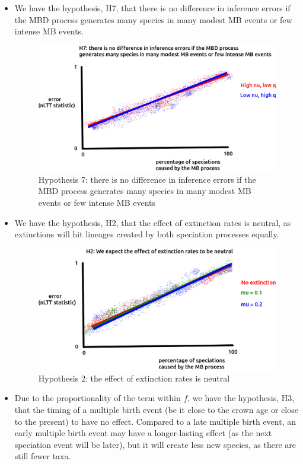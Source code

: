 \documentclass{article}
\begin{document}
\begin{itemize}
\item We have the hypothesis, H7, 
that there is no difference in inference errors if the MBD process
generates many species in many modest MB events or few intense MB events.

\begin{figure}[!htbp]
  \includegraphics[width=\textwidth]{fig_h_7.png}
  \caption{
    Hypothesis 7: there is no difference in inference errors if the MBD process
    generates many species in many modest MB events or few intense MB events
  }
  \label{fig_h_7}
\end{figure}

\item We have the hypothesis, H2, 
that the effect of extinction rates is neutral, 
as extinctions will hit lineages created by both speciation processes equally. 

\begin{figure}[!htbp]
  \includegraphics[width=\textwidth]{fig_h_2.png}
  \caption{
    Hypothesis 2: the effect of extinction rates is neutral
  }
  \label{fig_h_2}
\end{figure}

\item Due to the proportionality of the term within $f$, 
we have the hypothesis, H3, 
that the timing of a multiple birth event (be it close to the
crown age or close to the present) to have no effect. Compared to a late
multiple birth event, an early multiple birth event may have a 
longer-lasting effect (as the next speciation event will be later), but it
will create less new species, as there are still fewer taxa.


\end{itemize}
\end{document}
